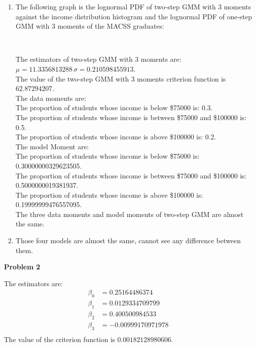 \documentclass[letterpaper,12pt]{article}
\theoremstyle{definition}
\numberwithin{equation}{section}
\begin{document}
\begin{enumerate} [\bfseries (a)]
\item The following graph is the lognormal PDF of two-step GMM with 3 moments against the income distribution histogram and the lognormal PDF of one-step GMM with 3 moments of the MACSS graduates:
\begin{figure}[H]
\centering
{}\
\end{figure}\par
The estimators of two-step GMM with 3 moments are: \(\mu = 11.3356813288 \, \sigma = 0.210598455913\). \\
The value of the two-step GMM with 3 moments criterion function is \(62.87294207\).\\
The data moments are:\\
The proportion of students whose income is below \$75000 is: 0.3.\\
The proportion of students whose income is between \$75000 and \$100000 is: 0.5.\\
The proportion of students whose income is above \$100000 is: 0.2.\\
The model Moment are:\\
The proportion of students whose income is below \$75000 is:  0.30000000329623505. \\
The proportion of students whose income is between \$75000 and \$100000 is: 0.5000000019381937.\\
The proportion of students whose income is above \$100000 is: 0.19999999476557095.\\
The three data moments and model moments of two-step GMM are almost the same.\par	

\item
Those four models are almost the same, cannot see any difference between them.\par
\end{enumerate}

\noindent \textbf{\large Problem 2}\par
The estimators are:\\
\begin{align*}
\beta_0 &= 0.25164486374\\
\beta_1 &= 0.0129334709799\\
\beta_2 &= 0.400500984533\\
\beta_3 &= -0.00999170971978\\
\end{align*}
The value of the criterion function is \(0.00182128980606\).
\end{document}
